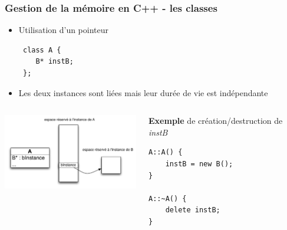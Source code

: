 \begin{frame}[fragile]\frametitle{Gestion de la mémoire en C++ - les classes}

\begin{itemize}
\itemsep1pt\parskip0pt
\item Utilisation d'un pointeur
\begin{lstlisting}
 class A {
 	B* instB;
 };
\end{lstlisting}
\item
  Les deux instances sont liées mais leur durée de vie est indépendante
\end{itemize}
\begin{columns}
\begin{column}{.6\textwidth}
\includegraphics[width=6cm]{fig/inclusion-classeB.pdf}
\end{column}
\begin{column}{.39\textwidth}
\textbf{Exemple} de création/destruction de \textit{instB}

\begin{lstlisting}
A::A() {
	instB = new B();
}

A::~A() {
	delete instB;
}
\end{lstlisting}
\end{column}
\end{columns}
\end{frame}

